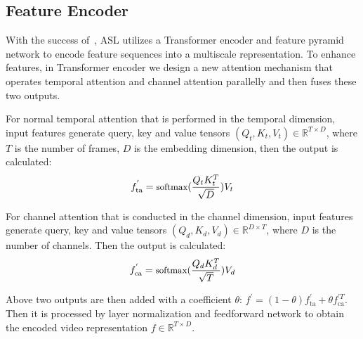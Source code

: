 \documentclass[10pt,twocolumn,letterpaper]{article}
\begin{document}
\subsection{Feature Encoder}
\par With the success of~\cite{zhang2022actionformer,afsd}, ASL utilizes a Transformer encoder and feature pyramid network to encode feature sequences into a multiscale representation. To enhance features, in Transformer encoder we design a new attention mechanism that operates temporal attention and channel attention parallelly and then fuses these two outputs.
\par For normal temporal attention that is performed in the temporal dimension, input features generate query, key and value tensors $(Q_t,K_t,V_t) \in \mathbb{R}^{T \times D}$, where $T$ is the number of frames, $D$ is the embedding dimension, then the output is calculated: 
\begin{equation} \small
    f_\text{ta}^{'} = \text{softmax}(\frac{Q_tK_t^T}{\sqrt{D}}) V_t
\end{equation}
\par For channel attention that is conducted in the channel dimension, input features generate query, key and value tensors $(Q_d,K_d,V_d) \in \mathbb{R}^{D \times T}$, where $D$ is the number of channels. Then the output is calculated:
\begin{equation} \small
    f_\text{ca}^{'} = \text{softmax}(\frac{Q_d K_d^T}{\sqrt{T}}) V_d
\end{equation}
\par Above two outputs are then added with a coefficient $\theta$: $f^{'} = (1-\theta)f_\text{ta}^{'} + \theta f_\text{ca}^{'T}$. Then it is processed by layer normalization and feedforward network to obtain the encoded video representation $f \in \mathbb{R}^{T\times D}$.
\end{document}
